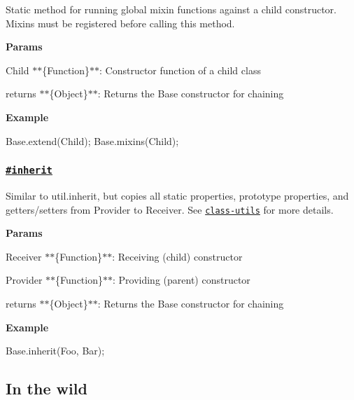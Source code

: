 Static method for running global mixin functions against a child constructor. Mixins must be registered before calling this method.

{\bfseries Params}


\begin{DoxyItemize}
\item {\ttfamily Child} $\ast$$\ast$\{Function\}$\ast$$\ast$\+: Constructor function of a child class
\item {\ttfamily returns} $\ast$$\ast$\{Object\}$\ast$$\ast$\+: Returns the {\ttfamily Base} constructor for chaining
\end{DoxyItemize}

{\bfseries Example}


\begin{DoxyCode}
Base.extend(Child);
Base.mixins(Child);
\end{DoxyCode}


\subsubsection*{\href{index.js#L420}{\tt \#inherit}}

Similar to {\ttfamily util.\+inherit}, but copies all static properties, prototype properties, and getters/setters from {\ttfamily Provider} to {\ttfamily Receiver}. See \href{https://github.com/jonschlinkert/class-utils#inherit}{\tt class-\/utils} for more details.

{\bfseries Params}


\begin{DoxyItemize}
\item {\ttfamily Receiver} $\ast$$\ast$\{Function\}$\ast$$\ast$\+: Receiving (child) constructor
\item {\ttfamily Provider} $\ast$$\ast$\{Function\}$\ast$$\ast$\+: Providing (parent) constructor
\item {\ttfamily returns} $\ast$$\ast$\{Object\}$\ast$$\ast$\+: Returns the {\ttfamily Base} constructor for chaining
\end{DoxyItemize}

{\bfseries Example}


\begin{DoxyCode}
Base.inherit(Foo, Bar);
\end{DoxyCode}


\subsection*{In the wild}

